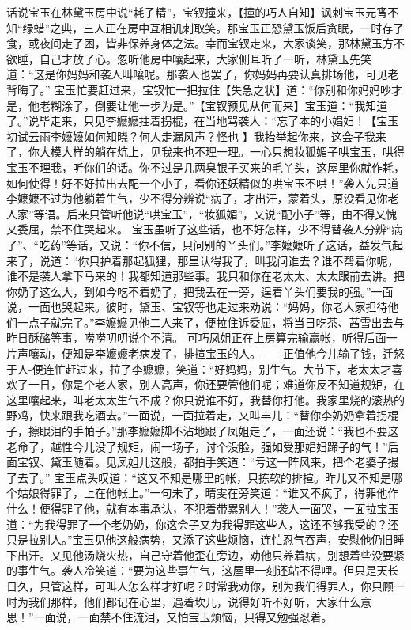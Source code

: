 \documentclass[12pt,oneside]{book}
\begin{document}
话说宝玉在林黛玉房中说“耗子精”，宝钗撞来，【撞的巧人自知】讽刺宝玉元宵不知“绿蜡”之典，三人正在房中互相讥刺取笑。那宝玉正恐黛玉饭后贪眠，一时存了食，或夜间走了困，皆非保养身体之法。幸而宝钗走来，大家谈笑，那林黛玉方不欲睡，自己才放了心。忽听他房中嚷起来，大家侧耳听了一听，林黛玉先笑道：“这是你妈妈和袭人叫嚷呢。那袭人也罢了，你妈妈再要认真排场他，可见老背晦了。”
宝玉忙要赶过来，宝钗忙一把拉住【失急之状】道：“你别和你妈妈吵才是，他老糊涂了，倒要让他一步为是。”【宝钗预见从何而来】宝玉道：“我知道了。”说毕走来，只见李嬷嬷拄着拐棍，在当地骂袭人：“忘了本的小娼妇！【宝玉初试云雨李嬷嬷如何知晓？何人走漏风声？怪也 】我抬举起你来，这会子我来了，你大模大样的躺在炕上，见我来也不理一理。一心只想妆狐媚子哄宝玉，哄得宝玉不理我，听你们的话。你不过是几两臭银子买来的毛丫头，这屋里你就作耗，如何使得！好不好拉出去配一个小子，看你还妖精似的哄宝玉不哄！”袭人先只道李嬷嬷不过为他躺着生气，少不得分辨说“病了，才出汗，蒙着头，原没看见你老人家”等语。后来只管听他说“哄宝玉”，“妆狐媚”，又说“配小子”等，由不得又愧又委屈，禁不住哭起来。
宝玉虽听了这些话，也不好怎样，少不得替袭人分辨“病了”、“吃药”等话，又说：“你不信，只问别的丫头们。”李嬷嬷听了这话，益发气起来了，说道：“你只护着那起狐狸，那里认得我了，叫我问谁去？谁不帮着你呢，谁不是袭人拿下马来的！我都知道那些事。我只和你在老太太、太太跟前去讲。把你奶了这么大，到如今吃不着奶了，把我丢在一旁，逞着丫头们要我的强。”一面说，一面也哭起来。彼时，黛玉、宝钗等也走过来劝说：“妈妈，你老人家担待他们一点子就完了。”李嬷嬷见他二人来了，便拉住诉委屈，将当日吃茶、茜雪出去与昨日酥酪等事，唠唠叨叨说个不清。
可巧凤姐正在上房算完输赢帐，听得后面一片声嚷动，便知是李嬷嬷老病发了，排揎宝玉的人。――正值他今儿输了钱，迁怒于人-便连忙赶过来，拉了李嬷嬷，笑道：“好妈妈，别生气。大节下，老太太才喜欢了一日，你是个老人家，别人高声，你还要管他们呢；难道你反不知道规矩，在这里嚷起来，叫老太太生气不成？你只说谁不好，我替你打他。我家里烧的滚热的野鸡，快来跟我吃酒去。”一面说，一面拉着走，又叫丰儿：“替你李奶奶拿着拐棍子，擦眼泪的手帕子。”那李嬷嬷脚不沾地跟了凤姐走了，一面还说：“我也不要这老命了，越性今儿没了规矩，闹一场子，讨个没脸，强如受那娼妇蹄子的气！”后面宝钗、黛玉随着。见凤姐儿这般，都拍手笑道：“亏这一阵风来，把个老婆子撮了去了。”
宝玉点头叹道：“这又不知是哪里的帐，只拣软的排揎。昨儿又不知是哪个姑娘得罪了，上在他帐上。”一句未了，晴雯在旁笑道：“谁又不疯了，得罪他作什么！便得罪了他，就有本事承认，不犯着带累别人！”袭人一面哭，一面拉宝玉道：“为我得罪了一个老奶奶，你这会子又为我得罪这些人，这还不够我受的？还只是拉别人。”宝玉见他这般病势，又添了这些烦恼，连忙忍气吞声，安慰他仍旧睡下出汗。又见他汤烧火热，自己守着他歪在旁边，劝他只养着病，别想着些没要紧的事生气。袭人冷笑道：“要为这些事生气，这屋里一刻还站不得哩。但只是天长日久，只管这样，可叫人怎么样才好呢？时常我劝你，别为我们得罪人，你只顾一时为我们那样，他们都记在心里，遇着坎儿，说得好听不好听，大家什么意思！”一面说，一面禁不住流泪，又怕宝玉烦恼，只得又勉强忍着。
\end{document}
